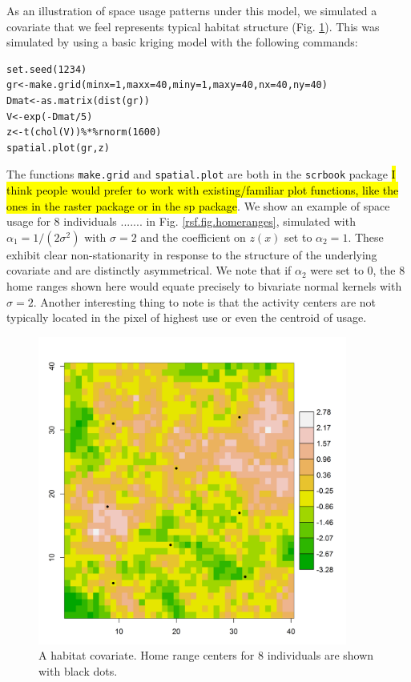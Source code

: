 As an illustration of space usage patterns under this model, we
simulated a covariate that we feel represents typical habitat
structure (Fig. \ref{rsf.fig.habitat}). This was simulated by using a
basic kriging model with the following commands:
\begin{verbatim}
set.seed(1234)
gr<-make.grid(minx=1,maxx=40,miny=1,maxy=40,nx=40,ny=40)
Dmat<-as.matrix(dist(gr))
V<-exp(-Dmat/5)
z<-t(chol(V))%*%rnorm(1600)
spatial.plot(gr,z)
\end{verbatim}
The functions \mbox{\tt make.grid} and \mbox{\tt spatial.plot} are
both in the \mbox{\tt scrbook} package \hl{I think people would prefer
  to work with existing/familiar plot functions, like the ones in the raster
  package or in the sp package}.  We show an example of space
usage for 8 individuals ....... in Fig. \ref{rsf.fig.homeranges},
simulated with $\alpha_{1} = 1/(2\sigma^2)$ with $\sigma = 2$ and the
coefficient on $z(x)$ set to $\alpha_{2} = 1$.  These exhibit clear
non-stationarity in response to the structure of the underlying
covariate and are distinctly asymmetrical.  We note that if
$\alpha_{2}$ were set to 0, the 8 home ranges shown here would equate
precisely to bivariate normal kernels with $\sigma = 2$.  Another
interesting thing to note is that the activity centers are not
typically located in the pixel of highest use or even the centroid of
usage.

\begin{figure}[htp]
\centering
\includegraphics[width=4in,height=4in]{Ch10b/figs/habitat}
\caption{A habitat covariate. Home range centers for 8 individuals are
shown with black dots.}
\label{rsf.fig.habitat}
\end{figure}


